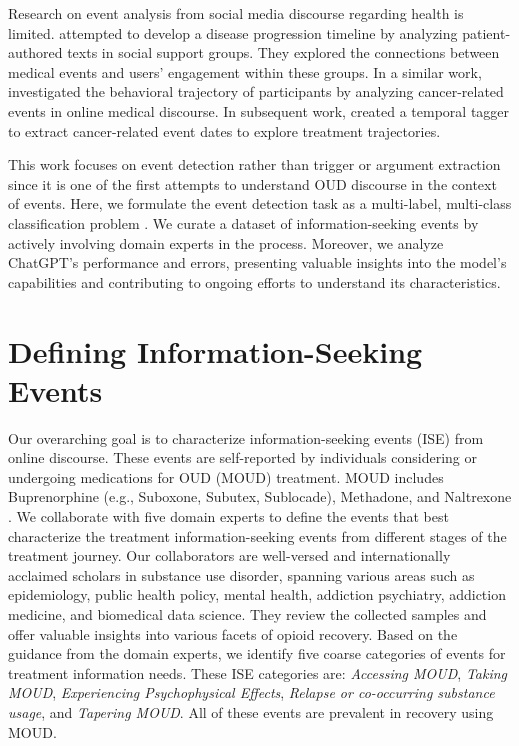 \documentclass[letterpaper]{article}
\begin{document}
Research on event analysis from social media discourse regarding health is limited. \citeauthor{naik-etal-2017-extracting}  attempted to develop a disease progression timeline by analyzing patient-authored texts in social support groups. They explored the connections between medical events and users' engagement within these groups. In a similar work, \citeauthor{wen_12}  investigated the behavioral trajectory of participants by analyzing cancer-related events in online medical discourse. In subsequent work, \citeauthor{wen-etal-2013-extracting}  created a temporal tagger to extract cancer-related event dates to explore treatment trajectories.

This work focuses on event detection rather than trigger or argument extraction since it is one of the first attempts to understand OUD discourse in the context of events. Here, we formulate the event detection task as a multi-label, multi-class classification problem \cite{BOGATINOVSKI2022117215}. We curate a dataset of information-seeking events by actively involving domain experts in the process. Moreover, we analyze ChatGPT's performance and errors, presenting valuable insights into the model's capabilities and contributing to ongoing efforts to understand its characteristics.


\section{Defining Information-Seeking Events}



Our overarching goal is to characterize information-seeking events (ISE) from online discourse. These events are self-reported by individuals considering or undergoing medications for OUD (MOUD) treatment. MOUD includes Buprenorphine (e.g., Suboxone, Subutex, Sublocade), Methadone, and Naltrexone \cite{dickson2022you}. We collaborate with five domain experts to define the events that best characterize the treatment information-seeking events from different stages of the treatment journey. Our collaborators are well-versed and internationally acclaimed scholars in substance use disorder, spanning various areas such as epidemiology, public health policy, mental health, addiction psychiatry, addiction medicine, and biomedical data science. They review the collected samples and offer valuable insights into various facets of opioid recovery. Based on the guidance from the domain experts, we identify five coarse categories of events for treatment information needs. These ISE categories are: \textit{Accessing MOUD}, \textit{Taking MOUD}, \textit{Experiencing Psychophysical Effects}, \textit{Relapse or co-occurring substance usage}, and \textit{Tapering MOUD}. All of these events are prevalent in recovery using MOUD.
\end{document}
